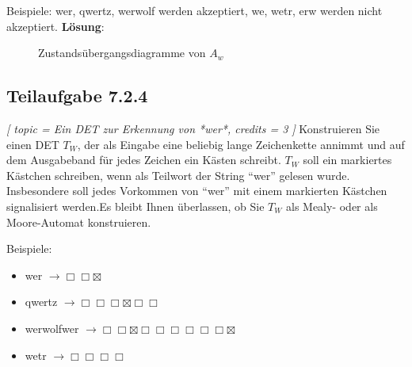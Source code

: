 \documentclass[12pt]{article}
\begin{document}
 Beispiele: wer, qwertz, werwolf werden akzeptiert, we, wetr, erw werden nicht akzeptiert. 
 \newpage
   \textbf{Lösung}:
  \begin{figure}[h] 
 \centering 
  
 \caption{Zustandsübergangsdiagramme von $A_{w}$} 
 \label{A234} 
 \end{figure} 
 
  
   \subsection*{Teilaufgabe 7.2.4} 
\textit{[ 
 topic = Ein DET zur Erkennung von *wer*, 
 credits = 3 
 ] 
  }
 Konstruieren Sie einen DET $T_W$, der als Eingabe eine beliebig lange Zeichenkette annimmt und auf dem Ausgabeband für jedes Zeichen ein Kästen schreibt. $T_W$ soll ein markiertes Kästchen schreiben, wenn als Teilwort der String "`wer"' gelesen wurde. Insbesondere soll jedes Vorkommen von "`wer"' mit einem markierten Kästchen signalisiert werden.Es bleibt Ihnen überlassen, ob Sie $T_W$ als Mealy- oder als Moore-Automat konstruieren. 
  
 Beispiele:  
 \begin{itemize} 
 \item wer $\rightarrow \Box\Box\boxtimes$ 
 \item qwertz $\rightarrow \Box\Box\Box\boxtimes\Box\Box$ 
 \item werwolfwer $\rightarrow \Box\Box\boxtimes\Box\Box\Box\Box\Box\Box\boxtimes$ 
 \item wetr $\rightarrow \Box\Box\Box\Box$ 
 \end{itemize} 

  
   
  
 
\end{document}
